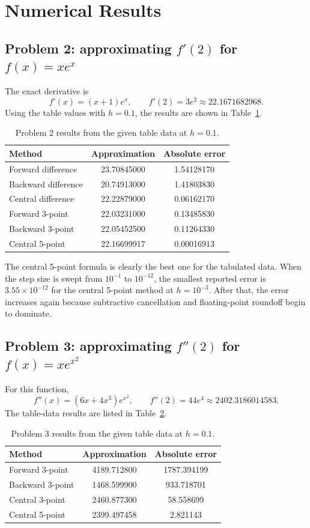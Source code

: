 \documentclass[12pt,a4paper]{article}
\begin{document}
\section{Numerical Results}

\subsection{Problem 2: approximating $f'(2)$ for $f(x)=xe^x$}

The exact derivative is
\[
f'(x)=(x+1)e^x,
\qquad
f'(2)=3e^2\approx 22.1671682968.
\]
Using the table values with $h=0.1$, the results are shown in Table~\ref{tab:p2table}.

\begin{table}[H]
\centering
\caption{Problem 2 results from the given table data at $h=0.1$.}
\label{tab:p2table}
\begin{tabular}{lcc}
\toprule
Method & Approximation & Absolute error \\
\midrule
Forward difference & 23.70845000 & 1.54128170 \\
Backward difference & 20.74913000 & 1.41803830 \\
Central difference & 22.22879000 & 0.06162170 \\
Forward 3-point & 22.03231000 & 0.13485830 \\
Backward 3-point & 22.05452500 & 0.11264330 \\
Central 5-point & 22.16699917 & 0.00016913 \\
\bottomrule
\end{tabular}
\end{table}

The central 5-point formula is clearly the best one for the tabulated data. When the step size is swept from $10^{-1}$ to $10^{-12}$, the smallest reported error is $3.55\times 10^{-12}$ for the central 5-point method at $h=10^{-3}$. After that, the error increases again because subtractive cancellation and floating-point roundoff begin to dominate.

\subsection{Problem 3: approximating $f''(2)$ for $f(x)=xe^{x^2}$}

For this function,
\[
f''(x)=(6x+4x^3)e^{x^2},
\qquad
f''(2)=44e^4\approx 2402.3186014583.
\]
The table-data results are listed in Table~\ref{tab:p3table}.

\begin{table}[H]
\centering
\caption{Problem 3 results from the given table data at $h=0.1$.}
\label{tab:p3table}
\begin{tabular}{lcc}
\toprule
Method & Approximation & Absolute error \\
\midrule
Forward 3-point & 4189.712800 & 1787.394199 \\
Backward 3-point & 1468.599900 & 933.718701 \\
Central 3-point & 2460.877300 & 58.558699 \\
Central 5-point & 2399.497458 & 2.821143 \\
\bottomrule
\end{tabular}
\end{table}
\end{document}
